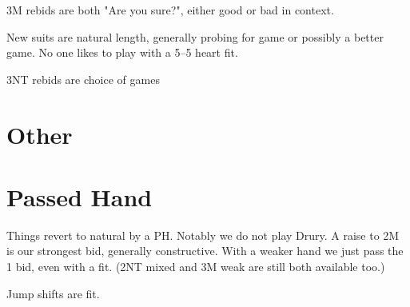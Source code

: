 \documentclass[main]{subfile}
\begin{document}
{	3M rebids are both "Are you sure?", either good or bad in context.  
	
	New suits are natural length, generally probing for game or possibly a better game.  No one likes to play  with a 5--5 heart fit.
	
	3NT rebids are choice of games
	 
\section {Other}	

	
\section{Passed Hand}

Things revert to natural by a PH.  Notably we do not play Drury.  A raise to 2M is our strongest bid, generally constructive.  With a weaker hand we just pass the 1 bid, even with a fit.  (2NT mixed and 3M weak are still both available too.)

Jump shifts are fit.

} %
	  
\end{document}
